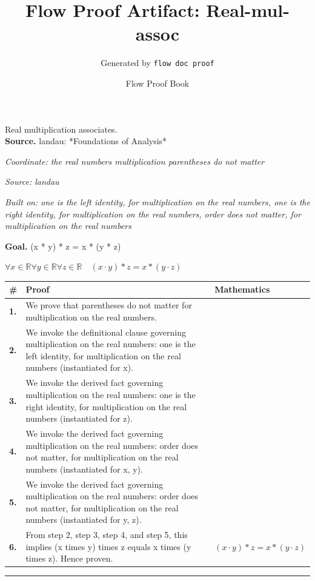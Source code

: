 \documentclass[11pt]{article}
\title{Flow Proof Artifact: Real-mul-assoc}
\author{Generated by \texttt{flow doc proof}}
\date{Flow Proof Book}
\theoremstyle{definition}
\begin{document}
\maketitle
Real multiplication associates.\\[0.5em]
\textbf{Source.} landau: *Foundations of Analysis*\\[0.5em]
\bigskip
{}\par
\smallskip\noindent\textit{Coordinate: the real numbers \cdot multiplication \cdot parentheses do not matter}\par
\smallskip\noindent\textit{Source: landau}\par
\smallskip\noindent\textit{Built on: one is the left identity, for multiplication on the real numbers, one is the right identity, for multiplication on the real numbers, order does not matter, for multiplication on the real numbers}\par
\medskip
\noindent\textbf{Goal.} (x * y) * z = x * (y * z)\par
\noindent$\displaystyle \forall x \in \mathbb{R} \forall y \in \mathbb{R} \forall z \in \mathbb{R}\quad (x \cdot y) * z = x * (y \cdot z)$\par
\medskip
\noindent
\begin{tabular}{@{} >{\raggedright\arraybackslash}p{} >{\raggedright\arraybackslash}p{} >{\raggedleft\arraybackslash}p{} @{}}
\textbf{\#} & \textbf{Proof} & \textbf{Mathematics} \\
\midrule
\textbf{1.} & We prove that parentheses do not matter for multiplication on the real numbers. & \\[0.45em]
\textbf{2.} & We invoke the definitional clause governing multiplication on the real numbers: one is the left identity, for multiplication on the real numbers (instantiated for x). & \\[0.45em]
\textbf{3.} & We invoke the derived fact governing multiplication on the real numbers: one is the right identity, for multiplication on the real numbers (instantiated for z). & \\[0.45em]
\textbf{4.} & We invoke the derived fact governing multiplication on the real numbers: order does not matter, for multiplication on the real numbers (instantiated for x, y). & \\[0.45em]
\textbf{5.} & We invoke the derived fact governing multiplication on the real numbers: order does not matter, for multiplication on the real numbers (instantiated for y, z). & \\[0.45em]
\textbf{6.} & From step 2, step 3, step 4, and step 5, this implies (x times y) times z equals x times (y times z). Hence proven. & $\displaystyle (x \cdot y) * z = x * (y \cdot z)$ \\[0.45em]
\bottomrule
\end{tabular}
\label{thm:Real-multiplication-parentheses_do_not_matter}
\par\medskip\hrule
\end{document}
